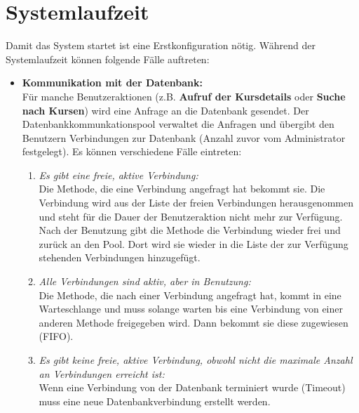 \section{Systemlaufzeit}
		Damit das System startet ist eine Erstkonfiguration nötig. Während der Systemlaufzeit können folgende Fälle auftreten:
		\begin{itemize}
			\item \textbf{Kommunikation mit der Datenbank:}\\
			 Für manche Benutzeraktionen (z.B. \textbf{Aufruf der Kursdetails} oder \textbf{Suche nach Kursen}) wird eine Anfrage an die Datenbank gesendet. Der Datenbankkommunkationspool verwaltet die Anfragen und übergibt den Benutzern Verbindungen zur Datenbank (Anzahl zuvor vom Administrator festgelegt). Es können verschiedene Fälle eintreten:
			\begin{enumerate}
				\item \emph{Es gibt eine freie, aktive Verbindung:} \\
				Die Methode, die eine Verbindung angefragt hat bekommt sie. Die Verbindung wird aus der Liste der freien Verbindungen herausgenommen und steht für die Dauer der Benutzeraktion nicht mehr zur Verfügung. Nach der Benutzung gibt die Methode die Verbindung wieder frei und zurück an den Pool. Dort wird sie wieder in die Liste der zur Verfügung stehenden Verbindungen hinzugefügt.
				\item \emph{Alle Verbindungen sind aktiv, aber in Benutzung:} \\
				Die Methode, die nach einer Verbindung angefragt hat, kommt in eine Warteschlange und muss solange warten bis eine Verbindung von einer anderen Methode freigegeben wird. Dann bekommt sie diese zugewiesen (FIFO).
				\item \emph{Es gibt keine freie, aktive Verbindung, obwohl nicht die maximale Anzahl an Verbindungen erreicht ist:}\\
				 Wenn eine Verbindung von der Datenbank terminiert wurde (Timeout) muss eine neue Datenbankverbindung erstellt werden.
				
			\end{enumerate}
			

\end{itemize}
